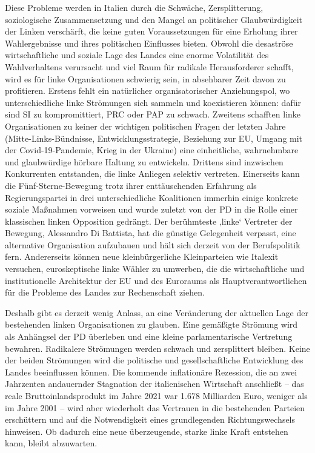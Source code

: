 \begin{multicols*}{2}
Diese Probleme werden in Italien durch die Schwäche, Zersplitterung, soziologische Zusammensetzung und den Mangel an politischer Glaubwürdigkeit der Linken verschärft, die keine guten Voraussetzungen für eine Erholung ihrer Wahlergebnisse und ihres politischen Einflusses bieten. Obwohl die desaströse wirtschaftliche und soziale Lage des Landes eine enorme Volatilität des Wahlverhaltens verursacht und viel Raum für radikale Herausforderer schafft, wird es für linke Organisationen schwierig sein, in absehbarer Zeit davon zu profitieren. Erstens fehlt ein natürlicher organisatorischer Anziehungspol, wo unterschiedliche linke Strömungen sich sammeln und koexistieren können: dafür sind SI zu kompromittiert, PRC oder PAP zu schwach. Zweitens schafften linke Organisationen zu keiner der wichtigen politischen Fragen der letzten Jahre (Mitte-Links-Bündnisse, Entwicklungsstrategie, Beziehung zur EU, Umgang mit der Covid-19-Pandemie, Krieg in der Ukraine) eine einheitliche, wahrnehmbare und glaubwürdige hörbare Haltung zu entwickeln. Drittens sind inzwischen Konkurrenten entstanden, die linke Anliegen selektiv vertreten. Einerseits kann die Fünf-Sterne-Bewegung trotz ihrer enttäuschenden Erfahrung als Regierungspartei in drei unterschiedliche Koalitionen immerhin einige konkrete soziale Maßnahmen vorweisen und wurde zuletzt von der PD in die Rolle einer klassischen linken Opposition gedrängt. Der berühmteste ‚linke‘ Vertreter der Bewegung, Alessandro Di Battista, hat die günstige Gelegenheit verpasst, eine alternative Organisation aufzubauen und hält sich derzeit von der Berufspolitik fern. Andererseits können neue kleinbürgerliche Kleinparteien wie Italexit versuchen, euroskeptische linke Wähler zu umwerben, die die wirtschaftliche und institutionelle Architektur der EU und des Euroraums als Hauptverantwortlichen für die Probleme des Landes zur Rechenschaft ziehen.\par

Deshalb gibt es derzeit wenig Anlass, an eine Veränderung der aktuellen Lage der bestehenden linken Organisationen zu glauben. Eine gemäßigte Strömung wird als Anhängsel der PD überleben und eine kleine parlamentarische Vertretung bewahren. Radikalere Strömungen werden schwach und zersplittert bleiben. Keine der beiden Strömungen wird die politische und gesellschaftliche Entwicklung des Landes beeinflussen können. Die kommende inflationäre Rezession, die an zwei Jahrzenten andauernder Stagnation der italienischen Wirtschaft anschließt – das reale Bruttoinlandsprodukt im Jahre 2021 war 1.678 Milliarden Euro, weniger als im Jahre 2001 – wird aber wiederholt das Vertrauen in die bestehenden Parteien erschüttern und auf die Notwendigkeit eines grundlegenden Richtungswechsels hinweisen. Ob dadurch eine neue überzeugende, starke linke Kraft entstehen kann, bleibt abzuwarten.\par
    

\end{multicols*}

